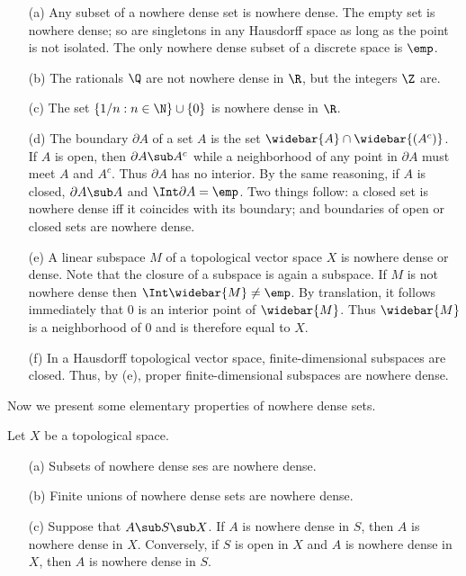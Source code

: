 \begin{example}
\mbox{}
\begin{itemize}
\item[(a)] Any subset of a nowhere dense set is nowhere dense. The empty set is nowhere dense; so are singletons in any Hausdorff space as long as the point is not isolated. The only nowhere dense subset of a discrete space is $\emp$.
\item[(b)] The rationals $\Q$ are not nowhere dense in $\R$, but the integers $\Z$ are.
\item[(c)] The set $\{1/n:n\in\N\}\cup\{0\}$ is nowhere dense in $\R$.
\item[(d)] The boundary $\partial A$ of a set $A$ is the set $\widebar{A}\cap\widebar{(A^c)}$. If $A$ is open, then $\partial A\sub A^c$ while a neighborhood of any point in $\partial A$ must meet $A$ and $A^c$. Thus $\partial A$ has no interior. By the same reasoning, if $A$ is closed, $\partial A\sub A$ and $\Int\partial A=\emp$. Two things follow: a closed set is nowhere dense iff it coincides with its boundary; and boundaries of open or closed sets are nowhere dense.
\item[(e)] A linear subspace $M$ of a topological vector space $X$ is nowhere dense or dense. Note that the closure of a subspace is again a subspace. If $M$ is not nowhere dense then $\Int\widebar{M}\neq\emp$. By translation, it follows immediately that $0$ is an interior point of $\widebar{M}$. Thus $\widebar{M}$ is a neighborhood of $0$ and is therefore equal to $X$.
\item[(f)] In a Hausdorff topological vector space, finite-dimensional subspaces are closed. Thus, by (e), proper finite-dimensional subspaces are nowhere dense. 
\end{itemize}
\end{example}
Now we present some elementary properties of nowhere dense sets.
\begin{proposition}\label{nowhere dense set prop}
Let $X$ be a topological space.
\begin{itemize}
\item[(a)] Subsets of nowhere dense ses are nowhere dense.
\item[(b)] Finite unions of nowhere dense sets are nowhere dense.
\item[(c)] Suppose that $A\sub S\sub X$. If $A$ is nowhere dense in $S$, then $A$ is nowhere dense in $X$. Conversely, if $S$ is open in $X$ and $A$ is nowhere dense in $X$, then $A$ is nowhere dense in $S$.
\end{itemize}
\end{proposition}
